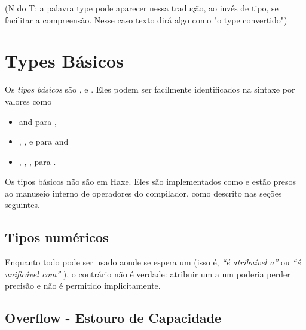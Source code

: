 (N do T: a palavra type pode aparecer nessa tradução, ao invés de tipo, se facilitar a compreensão. Nesse caso texto dirá algo como "o type convertido")


\section{Types Básicos}
\label{types-basic-types}

Os \emph{tipos básicos} são ,  e . Eles podem ser facilmente identificados na sintaxe por valores como

\begin{itemize}
	\item {} and  para ,
	\item {}, ,  e  para  and
	\item {}, , ,  para .
\end{itemize}

Os tipos básicos não são  em Haxe. Eles são implementados como  e estão presos ao manuseio interno de operadores do compilador, como descrito nas seções seguintes.

\subsection{Tipos numéricos}
\label{types-numeric-types}


Enquanto todo  pode ser usado aonde se espera um  (isso é,  \emph{``é atribuível a''} ou \emph{``é unificável com''} ), o contrário não é verdade: atribuir um  a um  poderia perder precisão e não é permitido implicitamente.

\subsection{Overflow - Estouro de Capacidade}
\label{types-overflow}

